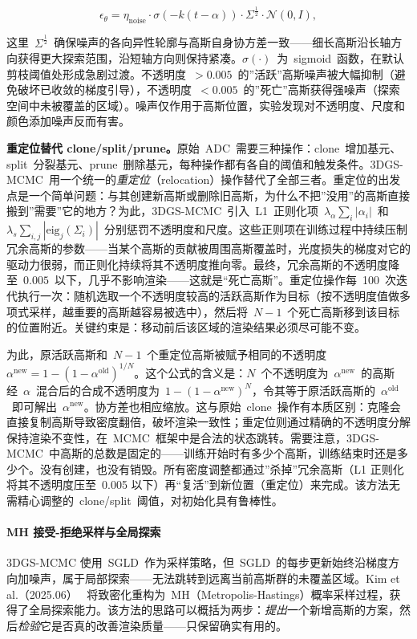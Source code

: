 \[
\epsilon_\theta = \eta_{\text{noise}} \cdot \sigma(-k(t - \alpha)) \cdot \Sigma^{\frac{1}{2}} \cdot \mathcal{N}(0, I),
\]

这里~$\Sigma^{\frac{1}{2}}$~确保噪声的各向异性轮廓与高斯自身协方差一致——细长高斯沿长轴方向获得更大探索范围，沿短轴方向则保持紧凑。$\sigma(\cdot)$~为~sigmoid~函数，在默认剪枝阈值处形成急剧过渡。不透明度~$>0.005$~的”活跃”高斯噪声被大幅抑制（避免破坏已收敛的梯度引导），不透明度~$<0.005$~的”死亡”高斯获得强噪声（探索空间中未被覆盖的区域）。噪声仅作用于高斯位置，实验发现对不透明度、尺度和颜色添加噪声反而有害。

\textbf{重定位替代 clone/split/prune。}原始~ADC~需要三种操作：clone~增加基元、split~分裂基元、prune~删除基元，每种操作都有各自的阈值和触发条件。3DGS-MCMC~用一个统一的\emph{重定位}（relocation）操作替代了全部三者。重定位的出发点是一个简单问题：与其创建新高斯或删除旧高斯，为什么不把”没用”的高斯直接搬到”需要”它的地方？为此，3DGS-MCMC~引入~L1~正则化项~$\lambda_{\alpha} \sum_i |\alpha_i|$~和~$\lambda_{s} \sum_{i,j} |\text{eig}_j(\Sigma_i)|$~分别惩罚不透明度和尺度。这些正则项在训练过程中持续压制冗余高斯的参数——当某个高斯的贡献被周围高斯覆盖时，光度损失的梯度对它的驱动力很弱，而正则化持续将其不透明度推向零。最终，冗余高斯的不透明度降至~$0.005$~以下，几乎不影响渲染——这就是``死亡高斯''。重定位操作每~100~次迭代执行一次：随机选取一个不透明度较高的活跃高斯作为目标（按不透明度值做多项式采样，越重要的高斯越容易被选中），然后将~$N-1$~个死亡高斯移到该目标的位置附近。关键约束是：移动前后该区域的渲染结果必须尽可能不变。

为此，原活跃高斯和~$N-1$~个重定位高斯被赋予相同的不透明度~$\alpha^{\text{new}} = 1 - (1-\alpha^{\text{old}})^{1/N}$。这个公式的含义是：$N$~个不透明度为~$\alpha^{\text{new}}$~的高斯经~$\alpha$~混合后的合成不透明度为~$1-(1-\alpha^{\text{new}})^N$，令其等于原活跃高斯的~$\alpha^{\text{old}}$~即可解出~$\alpha^{\text{new}}$。协方差也相应缩放。这与原始~clone~操作有本质区别：克隆会直接复制高斯导致密度翻倍，破坏渲染一致性；重定位则通过精确的不透明度分解保持渲染不变性，在~MCMC~框架中是合法的状态跳转。需要注意，3DGS-MCMC~中高斯的总数是固定的——训练开始时有多少个高斯，训练结束时还是多少个。没有创建，也没有销毁。所有密度调整都通过”杀掉”冗余高斯（L1 正则化将其不透明度压至~0.005 以下）再``复活''到新位置（重定位）来完成。该方法无需精心调整的~clone/split~阈值，对初始化具有鲁棒性。

\paragraph{MH 接受-拒绝采样与全局探索}
3DGS-MCMC 使用~SGLD~作为采样策略，但~SGLD~的每步更新始终沿梯度方向加噪声，属于局部探索——无法跳转到远离当前高斯群的未覆盖区域。Kim et al.（2025.06）~\cite{2506_12945} 将致密化重构为~MH（Metropolis-Hastings）概率采样过程，获得了全局探索能力。该方法的思路可以概括为两步：\emph{提出}一个新增高斯的方案，然后\emph{检验}它是否真的改善渲染质量——只保留确实有用的。

